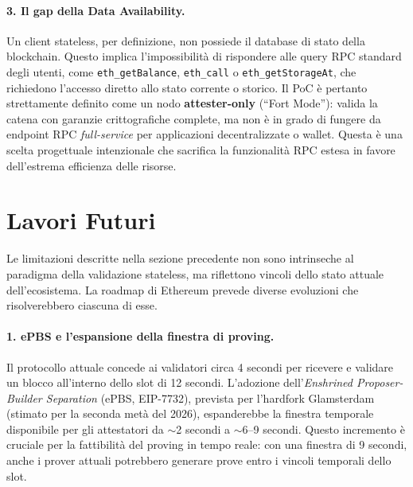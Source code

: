 \documentclass[12pt,a4paper,openright,twoside]{report}
\begin{document}
\paragraph{3. Il gap della Data Availability.}
Un client stateless, per definizione, non possiede il database di stato della blockchain. Questo implica l'impossibilità di rispondere alle query RPC standard degli utenti, come \texttt{eth\_getBalance}, \texttt{eth\_call} o \texttt{eth\_getStorageAt}, che richiedono l'accesso diretto allo stato corrente o storico. Il PoC è pertanto strettamente definito come un nodo \textbf{attester-only} (``Fort Mode''): valida la catena con garanzie crittografiche complete, ma non è in grado di fungere da endpoint RPC \textit{full-service} per applicazioni decentralizzate o wallet. Questa è una scelta progettuale intenzionale che sacrifica la funzionalità RPC estesa in favore dell'estrema efficienza delle risorse.


\section{Lavori Futuri}

Le limitazioni descritte nella sezione precedente non sono intrinseche al paradigma della validazione stateless, ma riflettono vincoli dello stato attuale dell'ecosistema. La roadmap di Ethereum prevede diverse evoluzioni che risolverebbero ciascuna di esse.

\paragraph{1. ePBS e l'espansione della finestra di proving.}
Il protocollo attuale concede ai validatori circa 4 secondi per ricevere e validare un blocco all'interno dello slot di 12 secondi. L'adozione dell'\textit{Enshrined Proposer-Builder Separation} (ePBS, EIP-7732)\cite{eip7732}, prevista per l'hardfork Glamsterdam (stimato per la seconda metà del 2026), espanderebbe la finestra temporale disponibile per gli attestatori da $\sim$2 secondi a $\sim$6--9 secondi\cite{l1_zkevm_roadmap}. Questo incremento è cruciale per la fattibilità del proving in tempo reale: con una finestra di 9 secondi, anche i prover attuali potrebbero generare prove entro i vincoli temporali dello slot.
\end{document}
